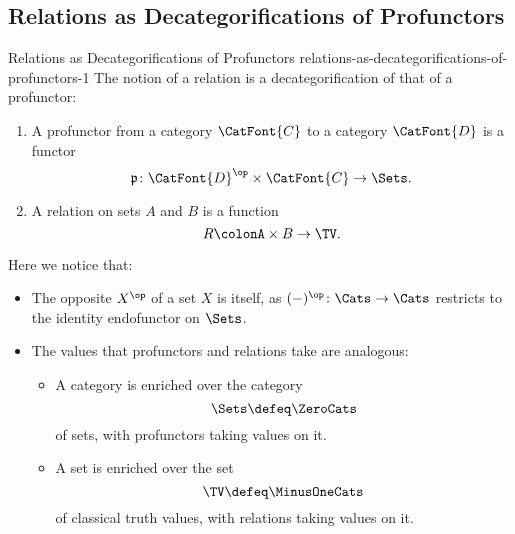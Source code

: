 \subsection{Relations as Decategorifications of Profunctors}\label{subsection-relations-as-decategorifications-of-profunctors}
\begin{remark}{Relations as Decategorifications of Profunctors \rmI}{relations-as-decategorifications-of-profunctors-1}%
    The notion of a relation is a decategorification of that of a profunctor:
    \begin{enumerate}
        \item A profunctor from a category $\CatFont{C}$ to a category $\CatFont{D}$ is a functor
            \[%
                \mathfrak{p}%
                \colon%
                \CatFont{D}^{\op}\times\CatFont{C}%
                \to%
                \Sets.%
            \]%
        \item A relation on sets $A$ and $B$ is a function%
            \[%
                R%
                \colon%
                A\times B%
                \to%
                \TV.%
            \]%
    \end{enumerate}
    Here we notice that:
    \begin{itemize}
        \item The opposite $X^{\op}$ of a set $X$ is itself, as $(-)^{\op}\colon\Cats\to\Cats$ restricts to the identity endofunctor on $\Sets$.
        \item The values that profunctors and relations take are analogous:
            \begin{itemize}
                \item A category is enriched over the category
                    \[
                        \Sets%
                        \defeq%
                        \ZeroCats%
                    \]%
                    of sets, with profunctors taking values on it.
                \item A set is enriched over the set
                    \[
                        \TV%
                        \defeq%
                        \MinusOneCats%
                    \]%
                    of classical truth values, with relations taking values on it.
            \end{itemize}
    \end{itemize}
\end{remark}
